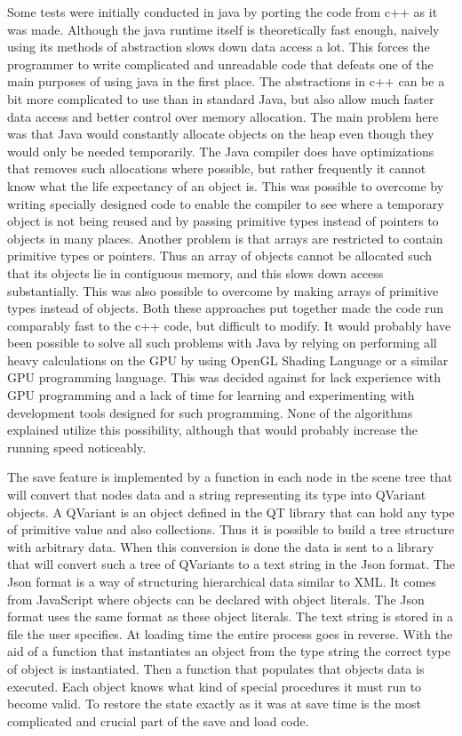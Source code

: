 \documentclass[a4paper,12pt]{report}
\begin{document}
Some tests were initially conducted in java by porting the code from c++ as it was made. Although the java runtime itself is theoretically fast enough, naively using its methods of abstraction slows down data access a lot. This forces the programmer to write complicated and unreadable code that defeats one of the main purposes of using java in the first place. The abstractions in c++ can be a bit more complicated to use than in standard Java, but also allow much faster data access and better control over memory allocation. The main problem here was that Java would constantly allocate objects on the heap even though they would only be needed temporarily. The Java compiler does have optimizations that removes such allocations where possible, but rather frequently it cannot know what the life expectancy of an object is. This was possible to overcome by writing specially designed code to enable the compiler to see where a temporary object is not being reused and by passing primitive types instead of pointers 
to objects in many places. Another problem is that arrays are restricted to contain primitive types or pointers. Thus an array of objects cannot be allocated such that its objects lie in contiguous memory, and this slows down access substantially. This was also possible to overcome by making arrays of primitive types instead of objects. Both these approaches put together made the code run comparably fast to the c++ code, but difficult to modify. It would probably have been possible to solve all such problems with Java by relying on performing all heavy calculations on the GPU by using OpenGL Shading Language or a similar GPU programming language. This was decided against for lack experience with GPU programming and a lack of time for learning and experimenting with development tools designed for such programming. None of the algorithms explained utilize this possibility, although that would probably increase the 
running speed noticeably.

The save feature is implemented by a function in each node in the scene tree that will convert that nodes data and a string representing its type into QVariant objects. A QVariant is an object defined in the QT library that can hold any type of primitive value and also collections. Thus it is possible to build a tree structure with arbitrary data. When this conversion is done the data is sent to a library that will convert such a tree of QVariants to a text string in the Json format. The Json format is a way of structuring hierarchical data similar to XML. It comes from JavaScript where objects can be declared with object literals. The Json format uses the same format as these object literals. The text string is stored in a file the user specifies. At loading time the entire process goes in reverse. With the aid of a function that instantiates an object from the type string the correct type of object is instantiated. Then a function that populates that objects data is executed. Each object knows what kind of 
special procedures it must run to become valid. To restore the state exactly as it was at save time is the most complicated and crucial part of the save and load code.
\end{document}
